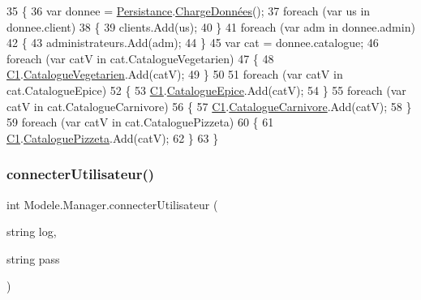 \begin{DoxyCode}
35         \{
36             var donnee = \hyperlink{classModele_1_1Manager_a29b4f8c42f993178aac1d16da7942324}{Persistance}.\hyperlink{interfaceModele_1_1IPersistanceManager_af5ae97787e17b1c24fe878ed3d381873}{ChargeDonnées}();
37             \textcolor{keywordflow}{foreach} (var us \textcolor{keywordflow}{in} donnee.client)
38             \{
39                 clients.Add(us);
40             \}
41             \textcolor{keywordflow}{foreach} (var adm \textcolor{keywordflow}{in} donnee.admin)
42             \{
43                 administrateurs.Add(adm);
44             \}
45             var cat = donnee.catalogue;
46             \textcolor{keywordflow}{foreach} (var catV \textcolor{keywordflow}{in} cat.CatalogueVegetarien)
47             \{
48                 \hyperlink{classModele_1_1Manager_a54bbc7bd646fcaa0f1a590310dd3c02c}{C1}.\hyperlink{classModele_1_1Catalogue_abd7d6d70ddd6ba264c1c91a5b084d9ba}{CatalogueVegetarien}.Add(catV);
49             \}
50                 
51             \textcolor{keywordflow}{foreach} (var catV \textcolor{keywordflow}{in} cat.CatalogueEpice)
52             \{
53                 \hyperlink{classModele_1_1Manager_a54bbc7bd646fcaa0f1a590310dd3c02c}{C1}.\hyperlink{classModele_1_1Catalogue_a633610212f42551a5755212e21bedbca}{CatalogueEpice}.Add(catV);
54             \}
55             \textcolor{keywordflow}{foreach} (var catV \textcolor{keywordflow}{in} cat.CatalogueCarnivore)
56             \{
57                 \hyperlink{classModele_1_1Manager_a54bbc7bd646fcaa0f1a590310dd3c02c}{C1}.\hyperlink{classModele_1_1Catalogue_a4af9ef768f67cef6dfe545e22a6d63af}{CatalogueCarnivore}.Add(catV);
58             \}
59             \textcolor{keywordflow}{foreach} (var catV \textcolor{keywordflow}{in} cat.CataloguePizzeta)
60             \{
61                 \hyperlink{classModele_1_1Manager_a54bbc7bd646fcaa0f1a590310dd3c02c}{C1}.\hyperlink{classModele_1_1Catalogue_ac5490e1026b5b08d43e30b68da893423}{CataloguePizzeta}.Add(catV);
62             \}
63         \}
\end{DoxyCode}
\mbox{\label{classModele_1_1Manager_ad2af53ab1af0c7def106a31ea70dd1e9}} 
\subsubsection{\texorpdfstring{connecter\+Utilisateur()}{connecterUtilisateur()}}
{\footnotesize\ttfamily int Modele.\+Manager.\+connecter\+Utilisateur (\begin{DoxyParamCaption}\item[{string}]{log,  }\item[{string}]{pass }\end{DoxyParamCaption})\hspace{0.3cm}{\ttfamily [inline]}}



